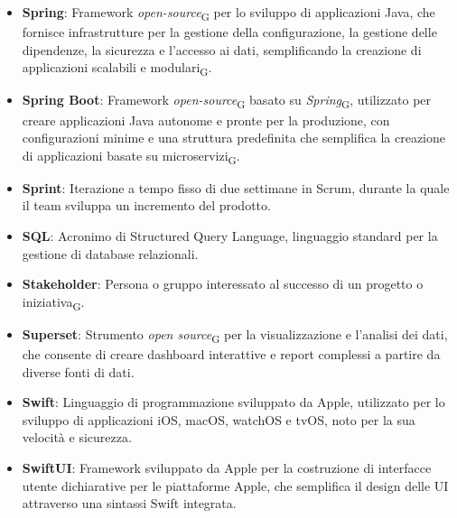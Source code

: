 \begin{itemize}
    \item \textbf{Spring}: Framework \textit{open-source}\textsubscript{G} per lo sviluppo di applicazioni Java, che fornisce infrastrutture per la gestione della configurazione, la gestione delle dipendenze, la sicurezza e l'accesso ai dati, semplificando la creazione di applicazioni scalabili e modulari\textsubscript{G}.
    \item \textbf{Spring Boot}: Framework \textit{open-source}\textsubscript{G} basato su \textit{Spring}\textsubscript{G}, utilizzato per creare applicazioni Java autonome e pronte per la produzione, con configurazioni minime e una struttura predefinita che semplifica la creazione di applicazioni basate su microservizi\textsubscript{G}.
    \item \textbf{Sprint}: Iterazione a tempo fisso di due settimane in Scrum, durante la quale il team sviluppa un incremento del prodotto.
    \item \textbf{SQL}: Acronimo di Structured Query Language, linguaggio standard per la gestione di database relazionali.
    \item \textbf{Stakeholder}: Persona o gruppo interessato al successo di un progetto o iniziativa\textsubscript{G}.
    \item \textbf{Superset}: Strumento \textit{open source}\textsubscript{G} per la visualizzazione e l'analisi dei dati, che consente di creare dashboard interattive e report complessi a partire da diverse fonti di dati.
    \item \textbf{Swift}: Linguaggio di programmazione sviluppato da Apple, utilizzato per lo sviluppo di applicazioni iOS, macOS, watchOS e tvOS, noto per la sua velocità e sicurezza.
    \item \textbf{SwiftUI}: Framework sviluppato da Apple per la costruzione di interfacce utente dichiarative per le piattaforme Apple, che semplifica il design delle UI attraverso una sintassi Swift integrata.
\end{itemize}

